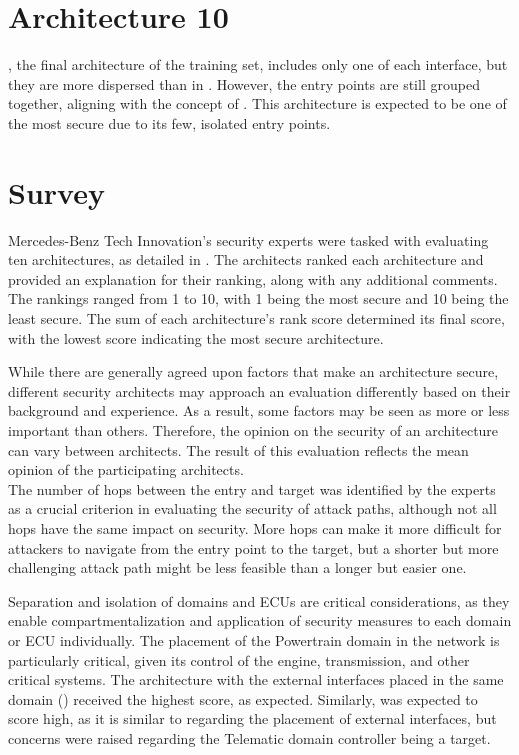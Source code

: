 \section{Architecture 10}
\label{subsec:arch10}

, the final architecture of the training set, includes only one of each interface, 
but they are more dispersed than in . 
However, the entry points are still grouped together, aligning with the concept of . 
This architecture is expected to be one of the most secure due to its few, isolated entry points.

\section{Survey}
\label{sec:survey}

Mercedes-Benz Tech Innovation's security experts were tasked with evaluating ten architectures, 
as detailed in . The architects ranked each architecture and provided an explanation 
for their ranking, along with any additional comments. 
The rankings ranged from 1 to 10, with 1 being the most secure and 10 being the least secure. 
The sum of each architecture's rank score determined its final score, 
with the lowest score indicating the most secure architecture.

While there are generally agreed upon factors that make an architecture secure, 
different security architects may approach an evaluation differently based on their background and experience. 
As a result, some factors may be seen as more or less important than others. 
Therefore, the opinion on the security of an architecture can vary between architects. 
The result of this evaluation reflects the mean opinion of the participating architects.\\

The number of hops between the entry and target was identified by the experts as a 
crucial criterion in evaluating the security of attack paths, although not all hops have the same impact on security. 
More hops can make it more difficult for attackers to navigate from the entry point to the target, 
but a shorter but more challenging attack path might be less feasible than a longer but easier one. 

Separation and isolation of domains and ECUs are critical considerations, 
as they enable compartmentalization and application of security measures to each domain or ECU individually. 
The placement of the Powertrain domain in the network is particularly critical, 
given its control of the engine, transmission, and other critical systems. 
The architecture with the external interfaces placed in the same domain () 
received the highest score, as expected. 
Similarly,  was expected to score high, as it is similar to  
regarding the placement of external interfaces, but concerns were raised regarding the Telematic domain controller being a target.

